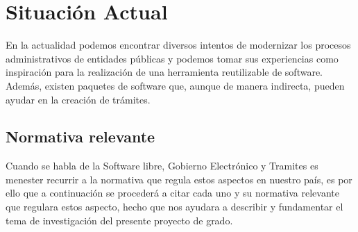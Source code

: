 \section{Situación Actual}

En la actualidad podemos encontrar diversos intentos de modernizar los procesos administrativos de entidades públicas y podemos tomar sus experiencias como inspiración para la realización de una herramienta reutilizable de software. Además, existen paquetes de software que, aunque de manera indirecta, pueden ayudar en la creación de trámites.
\subsection{Normativa relevante}
Cuando se habla de la Software libre, Gobierno Electrónico y Tramites es menester recurrir a la normativa que regula estos aspectos en nuestro país, es por ello que a continuación se procederá a citar cada uno y su normativa relevante que regulara estos aspecto, hecho que nos ayudara a describir y fundamentar el tema de investigación del presente proyecto de grado.
